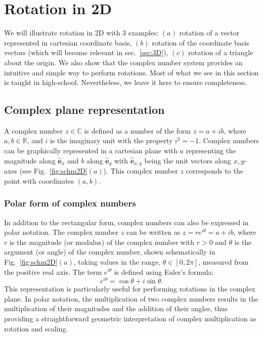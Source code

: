 \documentclass{article}
\def\eh{\hat{\mathbf{e}}}
\def\ehx{\hat{\mathbf{e}}_x}
\def\ehy{\hat{\mathbf{e}}_y}
\def\C{\mathcal{C}}
\def\Rn{\mathbb{R}}
\def\C{\mathbb{C}}
\begin{document}
\section{Rotation in 2D}
We will illustrate rotation in 2D with 3 examples: $(a)$ rotation of a vector represented in cartesian coordinate basis, $(b)$ rotation of the coordinate basis vectors (which will become relevant in sec.~\ref{sec:3D}), $(c)$ rotation of a triangle about the origin. We also show that the complex number system provides an intuitive and simple way to perform rotations. Most of what we see in this section is taught in high-school. Nevertheless, we leave it here to ensure completeness.

\subsection{Complex plane representation}\label{sec:comp2d}
A complex number $z \in \C$ is defined as a number of the form $z = a + i b$, where $a, b \in \Rn$, and $i$ is the imaginary unit with the property $i^2 = -1$. Complex numbers can be graphically represented in a cartesian plane with $a$ representing the magnitude along $\ehx$ and $b$ along $\ehy$ with $\eh_{x,y}$ being the unit vectors along $x, y$-axes (see Fig.~\ref{fig:schm2D}$(a)$). This complex number $z$ corresponds to the point with coordinates $(a, b)$.

\subsubsection*{Polar form of complex numbers}
In addition to the rectangular form, complex numbers can also be expressed in polar notation. The complex number $z$ can be written as $z = re^{i\theta} = a + ib$, where $r$ is the magnitude (or modulus) of the complex number with $r>0$ and $\theta$ is the argument (or angle) of the complex number, shown schematically in Fig.~\ref{fig:schm2D}$(a)$, taking values in the range, $\theta \in [ 0, 2\pi]$, measured from the positive real axis. The term $e^{i\theta}$ is defined using Euler's formula:
\[
e^{i\theta} = \cos \theta + i\sin \theta.
\]
This representation is particularly useful for performing rotations in the complex plane. In polar notation, the multiplication of two complex numbers results in the multiplication of their magnitudes and the addition of their angles, thus providing a straightforward geometric interpretation of complex multiplication as rotation and scaling.
\end{document}
